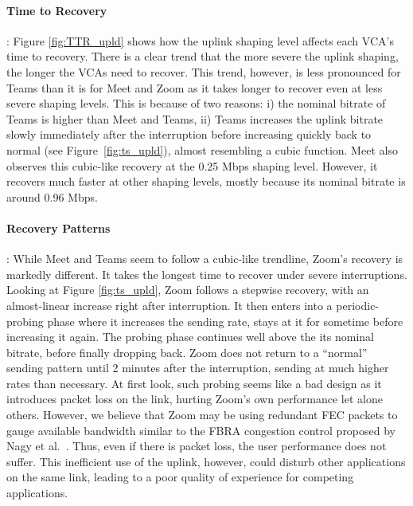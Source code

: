 \paragraph{Time to Recovery}: Figure \ref{fig:TTR_upld} shows how the uplink shaping level affects each VCA's time to recovery. There is a clear trend that the more severe the uplink shaping, the longer the VCAs need to recover. This trend, however, is less pronounced for Teams than it is for Meet and Zoom as it takes longer to recover even at less severe shaping levels. This is because of two reasons: i) the nominal bitrate of Teams is higher than Meet and Teams, ii)  Teams increases the uplink bitrate slowly immediately after the interruption before increasing quickly back to normal (see  Figure~\ref{fig:ts_upld}), almost resembling a cubic function. Meet also observes this cubic-like recovery at the 0.25 Mbps shaping level. However, it recovers much faster at other shaping levels, mostly because its nominal bitrate is around 0.96 Mbps. 

\paragraph{Recovery Patterns}: While Meet and Teams seem to follow a cubic-like trendline, Zoom's recovery is markedly different. It takes the longest time to recover under severe interruptions. Looking at Figure \ref{fig:ts_upld}, Zoom follows a stepwise recovery, with an almost-linear increase right after interruption. It then enters into a periodic-probing phase where it increases the sending rate, stays at it for sometime before increasing it again. The probing phase continues well above the its nominal bitrate, before finally dropping back. Zoom does not return to a ``normal'' sending pattern until 2 minutes after the interruption, sending at much higher rates than necessary. At first look, such probing seems like a bad design as it introduces packet loss on the link, hurting Zoom's own performance let alone others. However, we believe that Zoom may be using redundant FEC packets to gauge available bandwidth similar to the FBRA congestion control proposed by Nagy et al.~\cite{nagy2014congestion}. Thus, even if there is packet loss, the user performance does not suffer. This inefficient use of the uplink, however, could disturb other applications on the same link, leading to a poor quality of experience for competing applications. 

